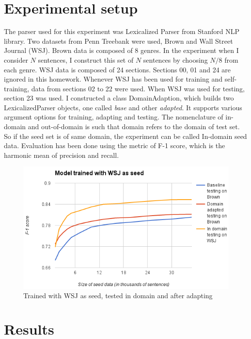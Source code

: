 \documentclass{article}
\begin{document}
\section{Experimental setup}
The parser used for this experiment was Lexicalized Parser from Stanford NLP library. Two datasets from Penn Treebank were used, Brown and Wall Street Journal (WSJ). Brown data is composed of 8 genres. In the experiment when I consider $N$ sentences, I construct this set of $N$ sentences by choosing $N/8$ from each genre. WSJ data is composed of 24 sections. Sections 00, 01 and 24 are ignored in this homework. Whenever WSJ has been used for training and self-training, data from sections 02 to 22 were used. When WSJ was used for testing, section 23 was used.
I constructed a class DomainAdaption, which builds two LexicalizedParser objects, one called \textit{base} and other \textit{adapted}. It supports various argument options for training, adapting and testing. 
The nomenclature of in-domain and out-of-domain is such that domain refers to the domain of test set. So if the seed set is of same domain, the experiment can be called In-domain seed data.
Evaluation has been done using the metric of F-1 score, which is the harmonic mean of precision and recall.\\
\begin{figure}
   \centering
   \hspace*{0.2in}
    \includegraphics[width=\linewidth]{plots/q4_3.png}
    \caption{Trained with WSJ as seed, tested in domain and after adapting}
   \label{fig:q4_3}
\end{figure}
\vspace{-2mm}
\section{Results}
\end{document}
